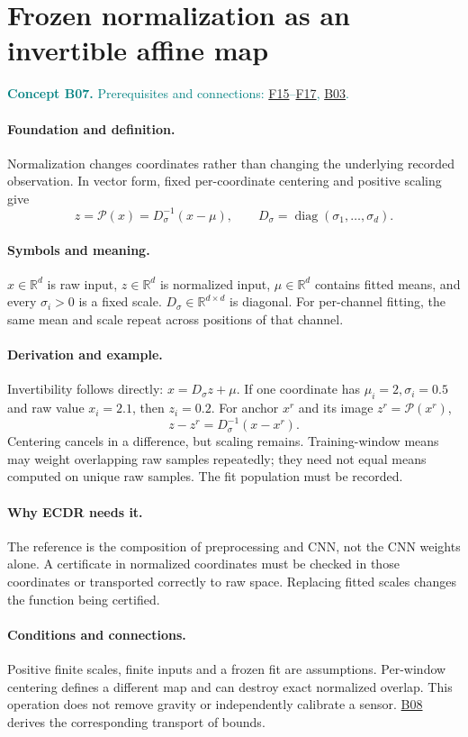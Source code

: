 \documentclass[11pt,a4paper]{article}
\newcommand{\R}{\mathbb R}
\newcommand{\conceptid}{Front matter}
\newcommand{\concept}[3]{\clearpage\renewcommand{\conceptid}{#1}%
\section{#2}\label{concept:#1}%
\textcolor{teal}{\textbf{Concept #1.} Prerequisites and connections: #3.}\par
\typeout{ECDR-CONCEPT-START #1 PAGE=\thepage}}
\begin{document}
\concept{B07}{Frozen normalization as an invertible affine map}{\hyperref[concept:F15]{F15}--\hyperref[concept:F17]{F17}, \hyperref[concept:B03]{B03}}
\paragraph{Foundation and definition.}
Normalization changes coordinates rather than changing the underlying
recorded observation. In vector form, fixed per-coordinate centering and
positive scaling give
\[
 z=\mathcal P(x)=D_\sigma^{-1}(x-\mu),\qquad
 D_\sigma=\operatorname{diag}(\sigma_1,\ldots,\sigma_d).
\]
\paragraph{Symbols and meaning.}
$x\in\R^d$ is raw input, $z\in\R^d$ is normalized input,
$\mu\in\R^d$ contains fitted means, and every $\sigma_i>0$ is a fixed
scale. $D_\sigma\in\R^{d\times d}$ is diagonal. For per-channel fitting,
the same mean and scale repeat across positions of that channel.
\paragraph{Derivation and example.}
Invertibility follows directly: $x=D_\sigma z+\mu$. If one coordinate has
$\mu_i=2,\sigma_i=0.5$ and raw value $x_i=2.1$, then $z_i=0.2$.
For anchor $x^r$ and its image $z^r=\mathcal P(x^r)$,
\[
 z-z^r=D_\sigma^{-1}(x-x^r).
\]
Centering cancels in a difference, but scaling remains. Training-window
means may weight overlapping raw samples repeatedly; they need not equal
means computed on unique raw samples. The fit population must be recorded.
\paragraph{Why ECDR needs it.}
The reference is the composition of preprocessing and CNN, not the CNN
weights alone. A certificate in normalized coordinates must be checked in
those coordinates or transported correctly to raw space. Replacing fitted
scales changes the function being certified.
\paragraph{Conditions and connections.}
Positive finite scales, finite inputs and a frozen fit are assumptions.
Per-window centering defines a different map and can destroy exact
normalized overlap. This operation does not remove gravity or independently
calibrate a sensor. \hyperref[concept:B08]{B08} derives the corresponding transport of bounds.
\par\label{endconcept:B07}
\end{document}
